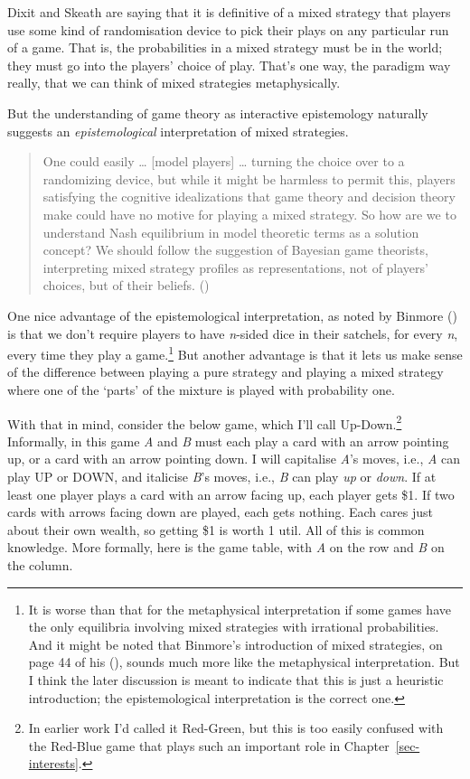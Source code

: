 \documentclass[
  12pt,
  letterpaper,
]{scrbook}
\begin{document}
Dixit and Skeath are saying that it is definitive of a mixed strategy
that players use some kind of randomisation device to pick their plays
on any particular run of a game. That is, the probabilities in a mixed
strategy must be in the world; they must go into the players' choice of
play. That's one way, the paradigm way really, that we can think of
mixed strategies metaphysically.

But the understanding of game theory as interactive epistemology
naturally suggests an \emph{epistemological} interpretation of mixed
strategies.

\begin{quote}
One could easily \ldots{} {[}model players{]} \ldots{} turning the
choice over to a randomizing device, but while it might be harmless to
permit this, players satisfying the cognitive idealizations that game
theory and decision theory make could have no motive for playing a mixed
strategy. So how are we to understand Nash equilibrium in model
theoretic terms as a solution concept? We should follow the suggestion
of Bayesian game theorists, interpreting mixed strategy profiles as
representations, not of players' choices, but of their beliefs.
()
\end{quote}

One nice advantage of the epistemological interpretation, as noted by
Binmore () is that we don't require
players to have \emph{n}-sided dice in their satchels, for every
\emph{n}, every time they play a game.\footnote{It is worse than that
  for the metaphysical interpretation if some games have the only
  equilibria involving mixed strategies with irrational probabilities.
  And it might be noted that Binmore's introduction of mixed strategies,
  on page 44 of his (), sounds much more
  like the metaphysical interpretation. But I think the later discussion
  is meant to indicate that this is just a heuristic introduction; the
  epistemological interpretation is the correct one.} But another
advantage is that it lets us make sense of the difference between
playing a pure strategy and playing a mixed strategy where one of the
`parts' of the mixture is played with probability one.

With that in mind, consider the below game, which I'll call
Up-Down.\footnote{In earlier work I'd called it Red-Green, but this is
  too easily confused with the Red-Blue game that plays such an
  important role in Chapter~\ref{sec-interests}.} Informally, in this
game \emph{A} and \emph{B} must each play a card with an arrow pointing
up, or a card with an arrow pointing down. I will capitalise \emph{A}'s
moves, i.e., \emph{A} can play UP or DOWN, and italicise \emph{B}'s
moves, i.e., \emph{B} can play \emph{up} or \emph{down}. If at least one
player plays a card with an arrow facing up, each player gets \$1. If
two cards with arrows facing down are played, each gets nothing. Each
cares just about their own wealth, so getting \$1 is worth 1 util. All
of this is common knowledge. More formally, here is the game table, with
\emph{A} on the row and \emph{B} on the column.
\end{document}
